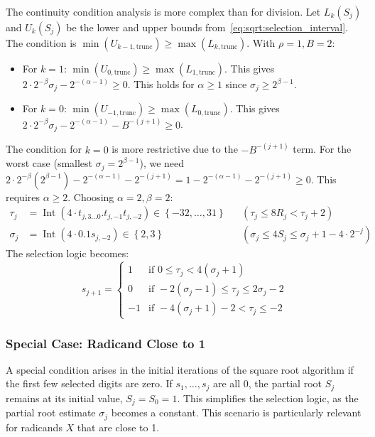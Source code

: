 \documentclass{article}
\DeclareMathOperator{\Int}{Int}
\begin{document}
The continuity condition analysis is more complex than for division.
Let $L_k(S_j)$ and $U_k(S_j)$ be the lower and upper bounds from~\cref{eq:sqrt:selection_interval}.
The condition is $\min(U_{k-1,\mathrm{trunc}}) \geq \max(L_{k,\mathrm{trunc}})$.
With $\rho = 1, B = 2$:
\begin{itemize}
  \item For $k = 1$: $\min(U_{0,\mathrm{trunc}}) \geq \max(L_{1,\mathrm{trunc}})$. This gives $2 \cdot 2^{-\beta} \sigma_j - 2^{-(\alpha-1)} \geq 0$. This holds for $\alpha \geq 1$ since $\sigma_j \geq 2^{\beta-1}$.
  \item For $k = 0$: $\min(U_{-1,\mathrm{trunc}}) \geq \max(L_{0,\mathrm{trunc}})$. This gives $2 \cdot 2^{-\beta} \sigma_j - 2^{-(\alpha-1)} - B^{-(j+1)} \geq 0$.
\end{itemize}
The condition for $k = 0$ is more restrictive due to the $-B^{-(j+1)}$ term.
For the worst case (smallest $\sigma_j = 2^{\beta-1}$), we need $2 \cdot 2^{-\beta} (2^{\beta-1}) - 2^{-(\alpha-1)} - 2^{-(j+1)} = 1 - 2^{-(\alpha-1)} - 2^{-(j+1)} \geq 0$.
This requires $\alpha \geq 2$.
Choosing $\alpha = 2, \beta = 2$:
\begin{align}
  \label{eq:sqrt:radix2_tau_val}
  \tau_j &= \Int(4 \cdot t_{j,3\ldots0}.t_{j,-1}t_{j,-2}) \in \left\{-32, \dots, 31\right\} && (\tau_j \leq 8 R_j < \tau_j + 2) \\
  \label{eq:sqrt:radix2_sigma_val}
  \sigma_j &= \Int(4 \cdot 0.1s_{j,-2}) \in \left\{2, 3\right\} && (\sigma_j \leq 4 S_j \leq \sigma_j + 1 - 4 \cdot 2^{-j})
\end{align}
The selection logic becomes:
\begin{equation}
  \label{eq:sqrt:radix2_logic}
  s_{j+1} =
  \begin{cases}
    1  & \text{if } 0 \leq \tau_j < 4 (\sigma_j + 1) \\
    0  & \text{if } -2 (\sigma_j - 1) \leq \tau_j \leq 2 \sigma_j - 2 \\
    -1 & \text{if } -4 (\sigma_j + 1) - 2 < \tau_j \leq -2
  \end{cases}
\end{equation}

\subsubsection{Special Case: Radicand Close to 1}
\label{sssec:sqrt:radix2_special}
A special condition arises in the initial iterations of the square root algorithm if the first few selected digits are zero.
If $s_1, \dots, s_j$ are all 0, the partial root $S_j$ remains at its initial value, $S_j = S_0 = 1$.
This simplifies the selection logic, as the partial root estimate $\sigma_j$ becomes a constant.
This scenario is particularly relevant for radicands $X$ that are close to 1.
\end{document}
